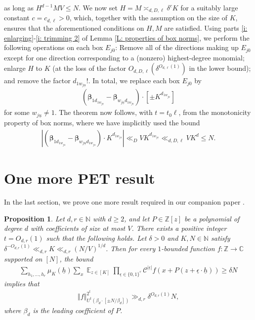 \documentclass[11pt]{amsart}
\newtheorem{proposition}[lemma]{Proposition}
\theoremstyle{definition}
\DeclareMathOperator*{\E}{\mathbb{E}}
\newcommand{\C}{{\mathbb C}}
\newcommand{\N}{{\mathbb N}}
\newcommand{\Z}{{\mathbb Z}}
\newcommand{\CC}{{\mathcal C}}
\newcommand{\bbeta}{{\boldsymbol{\beta}}}
\newcommand{\uh}{{\underline{h}}}
\newcommand{\uu}{{\underline{u}}}
\newcommand{\ueps}{{\underline{\epsilon}}}
\newcommand{\norm}[1]{\left\Vert #1\right\Vert}
\begin{document}
    as long as $H^{d-1} M V \leq N$.  We now set $H = M \asymp_{d, D, \ell} \delta^{c}K$ for a suitably large constant $c=c_{d,\ell}>0$,
which, together with the assumption on the size of $K$, ensures that the aforementioned conditions on $H,M$ are satisfied.  Using parts \eqref{i: enlarging}-\eqref{i: trimming 2} of Lemma \ref{L: properties of box norms}, we perform the following operations on each box $E_{j0}$: Remove all of the directions making up $E_{j0}$ except for one direction corresponding to a (nonzero) highest-degree monomial; enlarge $H$ to $K$ (at the loss of the factor $O_{d, D, \ell}(\delta^{O_{d, \ell}(1)})$ in the lower bound); and remove the factor $d_{1w_{j\uu}}!$.  In total, we replace each box $E_{j0}$ by
    \begin{align*}
        (\bbeta_{1d_{1w_{j\uu}}}-\bbeta_{w_{j\uu}d_{1w_{j\uu}}})\cdot [\pm K^{d_{1w_{j\uu}}}]
    \end{align*}
    for some $w_{j\uu}\neq 1$. The theorem now follows, with $t=t_0\ell$, from the monotonicity property of box norms, where we have implicitly used the bound
    \begin{align*}
        |        (\bbeta_{1d_{1w_{j\uu}}}-\bbeta_{w_{j\uu}d_{1w_{j\uu}}})\cdot K^{d_{1w_{j\uu}}}|\ll_D V K^{d_{1w_{j\uu}}} \ll_{d, D, \ell} V K^d \leq N.
    \end{align*}

\section{One more PET result}\label{S: one more PET}

In the last section, we prove one more result required in our companion paper \cite{KKL24b}.
\begin{proposition}
    Let $d,r\in\N$ with $d\geq 2$, and let $P\in\Z[z]$ be a polynomial of degree $d$ with coefficients of size at most $V$. There exists a positive integer $t = O_{d,r}(1)$ such that the following holds.  Let $\delta>0$ and $K,N\in\N$ satisfy $\delta^{-O_{d,r}(1)}\ll_{d,r} K\ll_{d,r} (N/V)^{1/d}$.  Then for every $1$-bounded function $f:\Z\to\C$ supported on $[N]$, the bound
    \begin{align}\label{E: average in one more PET}
        \sum_{h_1, \ldots, h_r}\mu_K(\uh)\sum_x \E_{z\in[K]} \prod_{\ueps\in\{0,1\}^{r}}\CC^{|\ueps|}f(x + P(z+\ueps\cdot\uh)) \geq \delta N
    \end{align}
    implies that
    \begin{align*}
    \norm{f}_{U^t(\beta_d\cdot[\pm N/\beta_d])}^{2^{t}}\gg_{d,r} \delta^{O_{d,r}(1)} N,
\end{align*}
where $\beta_d$ is the leading coefficient of $P$.
\end{proposition}
\end{document}
